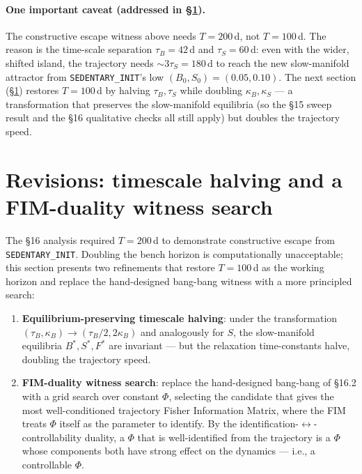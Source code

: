 \documentclass[11pt,a4paper]{article}
\theoremstyle{definition}
\begin{document}
\paragraph{One important caveat (addressed in §\ref{sec:revisions-v17}).} The constructive escape witness above needs $T = 200$\,d, not $T = 100$\,d. The reason is the time-scale separation $\tau_B = 42$\,d and $\tau_S = 60$\,d: even with the wider, shifted island, the trajectory needs $\sim 3\tau_S = 180$\,d to reach the new slow-manifold attractor from \texttt{SEDENTARY\_INIT}'s low $(B_0, S_0) = (0.05, 0.10)$. The next section (§\ref{sec:revisions-v17}) restores $T = 100$\,d by halving $\tau_B, \tau_S$ while doubling $\kappa_B, \kappa_S$ — a transformation that preserves the slow-manifold equilibria (so the §15 sweep result and the §16 qualitative checks all still apply) but doubles the trajectory speed.

\section{Revisions: timescale halving and a FIM-duality witness search} \label{sec:revisions-v17}

The §16 analysis required $T = 200$\,d to demonstrate constructive escape from \texttt{SEDENTARY\_INIT}. Doubling the bench horizon is computationally unacceptable; this section presents two refinements that restore $T = 100$\,d as the working horizon and replace the hand-designed bang-bang witness with a more principled search:

\begin{enumerate}
  \item \textbf{Equilibrium-preserving timescale halving}: under the transformation $(\tau_B, \kappa_B) \to (\tau_B / 2, 2\kappa_B)$ and analogously for $S$, the slow-manifold equilibria $B^*, S^*, F^*$ are invariant — but the relaxation time-constants halve, doubling the trajectory speed.
  \item \textbf{FIM-duality witness search}: replace the hand-designed bang-bang of §16.2 with a grid search over constant $\Phi$, selecting the candidate that gives the most well-conditioned trajectory Fisher Information Matrix, where the FIM treats $\Phi$ itself as the parameter to identify. By the identification-$\leftrightarrow$-controllability duality, a $\Phi$ that is well-identified from the trajectory is a $\Phi$ whose components both have strong effect on the dynamics — i.e., a controllable $\Phi$.
\end{enumerate}
\end{document}
